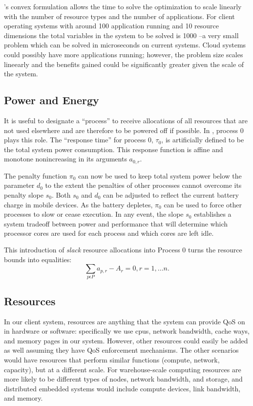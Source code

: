 \pacora's convex formulation allows the time to solve the optimization to scale linearly with the number of resource types and the number of applications.   For client operating systems with around 100 application running and 10 resource dimensions the total variables in the system to be solved is 1000 --a very small problem which can be solved in microseconds on current systems.   Cloud systems could possibly have more applications running; however, the problem size scales lineearly and the benefits gained could be significantly greater given the scale of the system.

\subsection*{Power and Energy}    

It is useful to designate a ``process'' to receive allocations of all resources
that are not used elsewhere and are therefore to be powered off if possible.
In \pacora, process 0 plays this role.
The ``response time'' for process 0, $\tau_0$,
is artificially defined to be the total system power consumption.
This response function is affine and monotone nonincreasing in its arguments $a_{0,r}$.

The penalty function $\pi_0$ can now be used to keep total system power below the parameter $d_0$
to the extent the penalties of other processes cannot overcome its penalty slope $s_0$.
Both $s_0$ and $d_0$ can be adjusted to reflect the current battery charge in mobile devices.
As the battery depletes, $\pi_0$ can be used to force other processes to slow or cease execution.
In any event, the slope $s_0$ establishes a system tradeoff between power and performance that
will determine which processor cores are used for each process and which cores are left idle.

This introduction of \emph{slack} resource allocations into Process 0 turns the resource bounds into equalities:
\begin{displaymath}
\sum_{p\epsilon P} a_{p,r} - A_r = 0, r = 1,\dots n.
\end{displaymath}


\subsection*{Resources}

In our client system, resources are anything that the system can provide QoS on in hardware or software: specifically we use cpus, network bandwidth, cache ways, and memory pages in our system.  However, other resources could easily be added as well assuming they have QoS enforcement mechanisms.  The other scenarios would have resources that perform similar functions (compute, network, capacity), but at a different scale. For warehouse-scale computing resources are more likely to be different types of nodes, network bandwidth, and storage, and distributed embedded systems would include compute devices, link bandwidth, and memory. 

